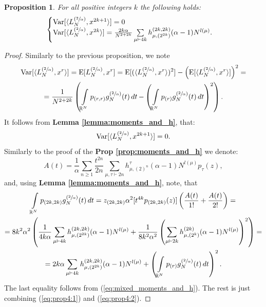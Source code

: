 \documentclass{article}
\newtheorem{proposition}{Proposition}
\newcommand{\Var}{\mathrm{Var}}
\newcommand{\E}{\mathrm{E}}
\begin{document}
\begin{proposition}\label{prop:variance_and_h}
    For all positive integers $k$ the following holds:
    \begin{equation}
        \begin{cases}
            \Var[\langle L_{N}^{(\sfrac{2}{\alpha})}, x^{2k + 1} \rangle] = 0 \\
            \Var[\langle L_{N}^{(\sfrac{2}{\alpha})}, x^{2k} \rangle] = \frac{2k\alpha}{N^{2 + 2k}}\sum\limits_{\mu \vdash 4k}h_{\mu, (2^{2k})}^{(2k, 2k)}(\alpha - 1)N^{l(\mu)}.
        \end{cases}
    \end{equation}
\end{proposition}
\begin{proof}
    Similarly to the previous proposition, we note
    \begin{multline}\label{eq:prop4:1}
        \Var[\langle L_{N}^{(\sfrac{2}{\alpha})}, x^{r} \rangle] = \E[L_{N}^{(\sfrac{2}{\alpha})}, x^{r}] = \E[(\langle L_{N}^{(\sfrac{2}{\alpha})}, x^{r} \rangle)^2] - \left(\E[\langle L_{N}^{(\sfrac{2}{\alpha})}, x^{r} \rangle]\right)^2 = \\
        = \frac{1}{N^{2 + 2k}}\left(\int\limits_{\mathbb{R}^N}p_{(r, r)}g_N^{(\sfrac{2}{\alpha})}(t)\mathop{dt} - \left(\int\limits_{\mathbb{R}^{N}}p_{(r)}g_N^{(\sfrac{2}{\alpha})}(t)\mathop{dt}\right)^2\right).
    \end{multline}
    It follows from \textbf{Lemma \ref{lemma:moments_and_h}}, that:
    $$
        \Var[\langle L_{N}^{(\sfrac{2}{\alpha})}, x^{2k + 1} \rangle] = 0.
    $$
    Similarly to the proof of the \textbf{Prop \ref{prop:moments_and_h}} we denote:
    $$
        A(t) = \frac{1}{\alpha}\sum\limits_{n \geq 1}\frac{t^{2n}}{2n}\sum\limits_{\mu, \tau \vdash 2n}h_{\mu, (2)^n}^{\tau}(\alpha - 1)N^{l(\mu)}p_{\tau}(z),
    $$
    and, using \textbf{Lemma \ref{lemma:moments_and_h}}, note, that
    \begin{multline}\label{eq:prop4:2}
        \int\limits_{\mathbb{R}^N}p_{(2k, 2k)}g_N^{(\sfrac{2}{\alpha})}(t)\mathop{dt} = z_{(2k, 2k)}\alpha^{2}[t^{4k}p_{(2k, 2k)}(z)]\left(\frac{A(t)}{1!} + \frac{A(t)}{2!}\right) = \\ =
        8k^2\alpha^2\left(\frac{1}{4k\alpha}\sum\limits_{\mu \vdash 4k}h_{\mu, (2^{2k})}^{(2k, 2k)}(\alpha - 1)N^{l(\mu)} + \frac{1}{8k^2\alpha^2}\left(\sum\limits_{\mu \vdash 2k}h_{\mu, (2^k)}^{(2k)}(\alpha - 1)N^{l(\mu)}\right)^2\right) = \\
        = 2k\alpha\sum\limits_{\mu \vdash 4k}h_{\mu, (2^{2k})}^{(2k, 2k)}(\alpha - 1)N^{l(\mu)} + \left(\int\limits_{\mathbb{R}^{N}}p_{(r)}g_N^{(\sfrac{2}{\alpha})}(t)\mathop{dt}\right)^2.
    \end{multline}
    The last equality follows from (\ref{eq:mixed_moments_and_h}). The rest is just combining (\ref{eq:prop4:1}) and (\ref{eq:prop4:2}).
\end{proof}
\end{document}
